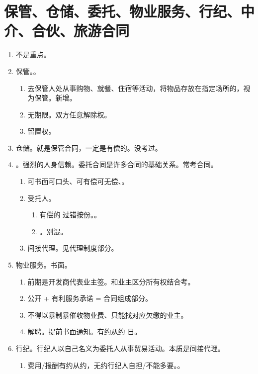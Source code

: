 \section{保管、仓储、委托、物业服务、行纪、中介、合伙、旅游合同}
\begin{enumerate}
  \item 不是重点。
  \item 保管。。
        \begin{enumerate}
          \item 去保管人处从事购物、就餐、住宿等活动，将物品存放在指定场所的，视为保管。新增。
          \item 无期限。双方任意解除权。
          \item 留置权。
        \end{enumerate}
  \item 仓储。就是保管合同，一定是有偿的。没考过。
  \item {}。强烈的人身信赖。委托合同是许多合同的基础关系。常考合同。
        \begin{enumerate}
          \item 可书面可口头、可有偿可无偿、。
          \item 受托人。
                \begin{enumerate}
                  \item 有偿的 \yjt 过错按份。。
                  \item {}。别混。
                \end{enumerate}
          \item 间接代理。见代理制度部分。
        \end{enumerate}
  \item 物业服务。书面。
        \begin{enumerate}
          \item 前期是开发商代表业主签。和业主区分所有权结合考。
          \item 公开 + 有利服务承诺 = 合同组成部分。
          \item 不得以暴制暴催收物业费、只能找对应欠缴的业主。
          \item 解聘。提前书面通知。有约从约  日。
        \end{enumerate}
  \item 行纪。行纪人以自己名义为委托人从事贸易活动。本质是间接代理。
        \begin{enumerate}
          \item 费用/报酬有约从约，无约行纪人自担/不能多要。。

\end{enumerate}
\end{enumerate}

